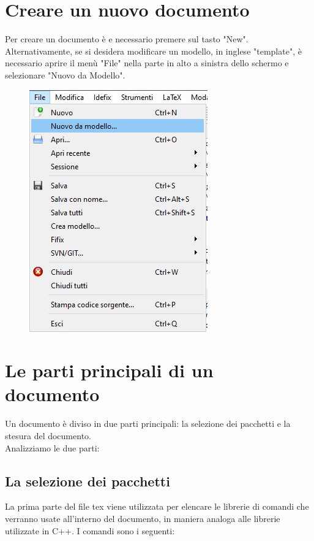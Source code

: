 \documentclass[12pt, oneside, openany, a4paper]{book}
\begin{document}
		\chapter{Creare un nuovo documento}
		Per creare un documento è e necessario premere sul tasto "New". Alternativamente, se si desidera modificare un modello, in inglese "template", è necessario aprire il menù "File" nella parte in alto a sinistra dello schermo e selezionare "Nuovo da Modello".
		\begin{figure}[h]
			\centering
			\includegraphics[scale=0.7]{Chap3/NuovoDaModello.png}
		\end{figure}
		
	\chapter{Le parti principali di un documento}
	Un documento è diviso in due parti principali: la selezione dei pacchetti e la stesura del documento.
	\\\noindent Analizziamo le due parti:
	\section{La selezione dei pacchetti}
	La prima parte del file tex viene utilizzata per elencare le librerie di comandi che verranno usate all'interno del documento, in maniera analoga alle librerie utilizzate in C++. I comandi sono i seguenti:
\end{document}

